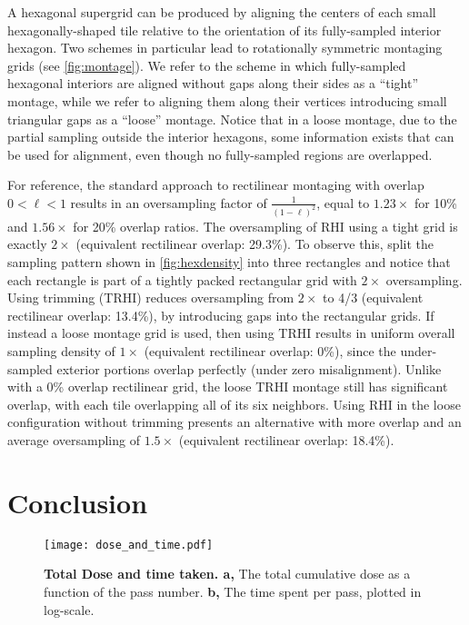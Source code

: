 \documentclass[aip, amsmath, amssymb, nobibnotes, nofootinbib, citeautoscript, reprint, superscriptaddress]{revtex4-2}
\begin{document}
    A hexagonal supergrid can be produced by aligning the centers of each small hexagonally-shaped tile relative to the orientation of its fully-sampled interior hexagon.
    Two schemes in particular lead to rotationally symmetric montaging grids (see \autoref{fig:montage}).
    We refer to the scheme in which fully-sampled hexagonal interiors are aligned without gaps along their sides as a ``tight'' montage, while we refer to aligning them along their vertices introducing small triangular gaps as a ``loose'' montage.
    Notice that in a loose montage, due to the partial sampling outside the interior hexagons, some information exists that can be used for alignment, even though no fully-sampled regions are overlapped.


    For reference, the standard approach to rectilinear montaging with overlap $0<\ell<1$ results in an oversampling factor of $\frac{1}{(1-\ell)^2}$, equal to $1.23\times$ for 10\% and $1.56\times$ for 20\% overlap ratios.
    The oversampling of RHI using a tight grid is exactly $2\times$ (equivalent rectilinear overlap: 29.3\%).
    To observe this, split the sampling pattern shown in \autoref{fig:hexdensity} into three rectangles and notice that each rectangle is part of a tightly packed rectangular grid with $2\times$ oversampling.
    Using trimming (TRHI) reduces oversampling from $2\times$ to 4/3 (equivalent rectilinear overlap: 13.4\%), by introducing gaps into the rectangular grids.
    If instead a loose montage grid is used, then using TRHI results in uniform overall sampling density of $1\times$ (equivalent rectilinear overlap: 0\%), since the under-sampled exterior portions overlap perfectly (under zero misalignment).
    Unlike with a 0\% overlap rectilinear grid, the loose TRHI montage still has significant overlap, with each tile overlapping all of its six neighbors.
    Using RHI in the loose configuration without trimming presents an alternative with more overlap and an average oversampling of $1.5\times$ (equivalent rectilinear overlap: 18.4\%).

    \section{\label{sec:conclusion}Conclusion}
    \begin{figure}
        \texttt{[image: dose\_and\_time.pdf]}
        \caption{
        \label{fig:dose} 
            \textbf{Total Dose and time taken. a,} The total cumulative dose as a function of the pass number. \textbf{b,} The time spent per pass, plotted in log-scale.
        }
    \end{figure}
\end{document}
